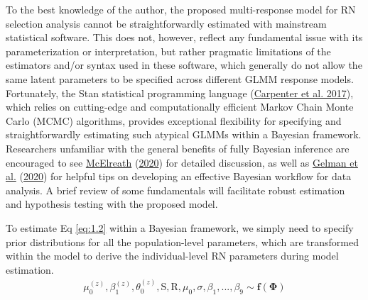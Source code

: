 \documentclass{article}
\begin{document}
To the best knowledge of the author, the proposed multi-response model
for RN selection analysis cannot be straightforwardly estimated with
mainstream statistical software. This does not, however, reflect any
fundamental issue with its parameterization or interpretation, but
rather pragmatic limitations of the estimators and/or syntax used in
these software, which generally do not allow the same latent parameters
to be specified across different GLMM response models. Fortunately, the
Stan statistical programming language
(\protect\hyperlink{ref-Stan}{Carpenter et al. 2017}), which relies on
cutting-edge and computationally efficient Markov Chain Monte Carlo
(MCMC) algorithms, provides exceptional flexibility for specifying and
straightforwardly estimating such atypical GLMMs within a Bayesian
framework. Researchers unfamiliar with the general benefits of fully
Bayesian inference are encouraged to see
\protect\hyperlink{ref-Rethinking}{McElreath}
(\protect\hyperlink{ref-Rethinking}{2020}) for detailed discussion, as
well as \protect\hyperlink{ref-Gelman2020}{Gelman et al.}
(\protect\hyperlink{ref-Gelman2020}{2020}) for helpful tips on
developing an effective Bayesian workflow for data analysis. A brief
review of some fundamentals will facilitate robust estimation and
hypothesis testing with the proposed model.

To estimate Eq \ref{eq:1.2} within a Bayesian framework, we simply need
to specify prior distributions for all the population-level parameters,
which are transformed within the model to derive the individual-level RN
parameters during model estimation. \begin{align*}
\mu_0^{(z)},\beta_1^{(z)}, \theta_0^{(z)}, \boldsymbol{\mathrm{S}}, \boldsymbol{\mathrm{R}}, \mu_0, \sigma, \beta_1, ... , \beta_9
\sim \boldsymbol{f}(\boldsymbol{\Phi})
\end{align*}
\end{document}
